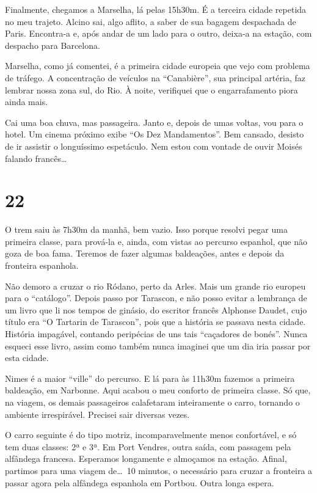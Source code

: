 Finalmente, chegamos a Marselha, lá pelas 15h30m. É a terceira cidade repetida no meu trajeto. Alcino sai, algo aflito, a saber de sua bagagem despachada de Paris. Encontra-a e, após andar de um lado para o outro, deixa-a na estação, com despacho para Barcelona.

Marselha, como já comentei, é a primeira cidade europeia que vejo com problema de tráfego. A concentração de veículos na ``Canabière'', sua principal artéria, faz lembrar nossa zona sul, do Rio. À noite, verifiquei que o engarrafamento piora ainda mais.

Cai uma boa chuva, mas passageira. Janto e, depois de umas voltas, vou para o hotel. Um cinema próximo exibe ``Os Dez Mandamentos''. Bem cansado, desisto de ir assistir o longuíssimo espetáculo. Nem estou com vontade de ouvir Moisés falando francês\ldots

\section*{22 \adfflatleafright {}}
O trem saiu às 7h30m da manhã, bem vazio. Isso porque resolvi pegar uma primeira classe, para prová-la e, ainda, com vistas ao percurso espanhol, que não goza de boa fama. Teremos de fazer algumas baldeações, antes e depois da fronteira espanhola.

Não demoro a cruzar o rio Ródano, perto da Arles. Mais um grande rio europeu para o ``catálogo''. Depois passo por Tarascon, e não posso evitar a lembrança de um livro que li nos tempos de ginásio, do escritor francês Alphonse Daudet, cujo título era ``O Tartarin de Tarascon'', pois que a história se passava nesta cidade. História impagável, contando peripécias de uns tais ``caçadores de bonés''. Nunca esqueci esse livro, assim como também nunca imaginei que um dia iria passar por esta cidade.

Nimes é a maior ``ville'' do percurso. E lá para às 11h30m fazemos a primeira baldeação, em Narbonne. Aqui acabou o meu conforto de primeira classe. Só que, na viagem, os demais passageiros calafetaram inteiramente o carro, tornando o ambiente irrespirável. Precisei sair diversas vezes.

O carro seguinte é do tipo motriz, incomparavelmente menos confortável, e só tem duas classes: 2ª e 3ª. Em Port Vendres, outra saída, com passagem pela alfândega francesa. Esperamos longamente e almoçamos na estação. Afinal, partimos para uma viagem de\ldots\ 10 minutos, o necessário para cruzar a fronteira a passar agora pela alfândega espanhola em Portbou. Outra longa espera.

